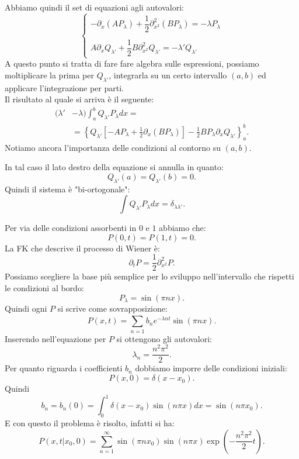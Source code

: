 Abbiamo quindi il set di equazioni agli autovalori:
\begin{equation}
    \begin{cases}
	-\partial_{x}(AP_\lambda) + \dfrac{1}{2}\partial^2_{x^2}(BP_\lambda) = -\lambda P_\lambda\\
	\\
	A\partial_{x}Q_{\lambda'} + \dfrac{1}{2}B\partial^2_{x^2}Q_{\lambda'} = - \lambda'Q_{\lambda'}
    \end{cases}
\end{equation}
A questo punto si tratta di fare fare algebra sulle espressioni, possiamo moltiplicare la prima per $Q_{\lambda'}$, integrarla su un certo intervallo $(a,b)$  ed applicare l'integrazione per parti.\\
Il risultato al quale si arriva è il seguente:
\[\begin{aligned}
    (\lambda'&-\lambda) \int_{a}^{b} Q_{\lambda'}P_{\lambda}dx = \\
             &= \left\{Q_{\lambda'}\left[-AP_\lambda  + \frac{1}{2}\partial_{x}(BP_\lambda) \right] -
		       \frac{1}{2}BP_{\lambda}\partial_{x}Q_{\lambda'}\right\}_{a}^{b}
.\end{aligned}\]
Notiamo ancora l'importanza delle condizioni al contorno su $(a,b)$. 
\begin{exmp}
    In tal caso il lato destro della equazione si annulla in quanto:
    \[
	Q_{\lambda'}(a) = Q_{\lambda'}(b) = 0
    .\] 
    Quindi il sistema è "bi-ortogonale":
    \[
        \int Q_{\lambda'}P_{\lambda}dx = \delta_{\lambda\lambda'}
    .\] 
\end{exmp}
\noindent
\begin{exmp}
    Per via delle condizioni assorbenti in $0$ e $1$ abbiamo che:
    \[
	P(0,t) = P(1,t) = 0
    .\] 
    La FK che descrive il processo di Wiener è:
    \[
        \partial_{t}P = \frac{1}{2}\partial^2_{x^2}P
    .\] 
    Possiamo scegliere la base più semplice per lo sviluppo nell'intervallo che rispetti le condizioni al bordo:
    \[
	P_\lambda =\sin (\pi n x) 
    .\] 
    Quindi ogni $P$ si scrive come sovrapposizione:
    \[
	P(x,t) = \sum_{n=1}^{} b_n e^{-\lambda n t}\sin (\pi n x) 
    .\] 
    Inserendo nell'equazione per $P$  si ottengono gli autovalori:
    \[
        \lambda_n = \frac{n^2\pi^2}{2}
    .\] 
    Per quanto riguarda i coefficienti $b_n$  dobbiamo imporre delle condizioni iniziali:
    \[
	P(x,0) = \delta (x-x_0) 
    .\] 
    Quindi
    \[
	b_n = b_n(0) = \int_{0}^{1} \delta (x-x_0) \sin (n\pi x)  dx = \sin (n\pi x_0) 
    .\] 
    E con questo il problema è risolto, infatti si ha:
    \[
	P(x,t|x_0, 0) = \sum_{n=1}^{\infty} \sin (\pi nx_0) \sin (n\pi x) \exp\left(-\frac{n^2\pi^2 }{2}t\right)
    .\] 
\end{exmp}
